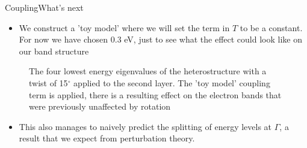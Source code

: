 \documentclass[9pt]{beamer}
\begin{document}
\begin{frame}{Coupling}{What's next}
  \begin{itemize}
    \item We construct a 'toy model' where we will set the term in $T$ to be a constant. For now we have chosen 0.3 eV, just to see what the effect could look like on our band structure
  \end{itemize}

  \begin{figure}
    \centering
    \caption{The four lowest energy eigenvalues of the heterostructure with a twist of 15$^\circ$ applied to the second layer. The 'toy model' coupling term is applied, there is a resulting effect on the electron bands that were previously unaffected by rotation}
  \end{figure}

  \begin{itemize}
    \item This also manages to naively predict the splitting of energy levels at $\Gamma$, a result that we expect from perturbation theory.
  \end{itemize}
\end{frame}
\end{document}
